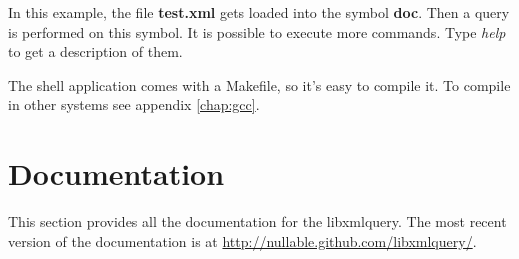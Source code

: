 \documentclass[a4paper]{report}
\begin{document}
		In this example, the file \textbf{test.xml} gets loaded into the symbol \textbf{doc}. Then a query is performed on this symbol. It is possible to execute more commands. Type \emph{help} to get a description of them.
		
		The shell application comes with a Makefile, so it's easy to compile it. To compile in other systems see appendix \ref{chap:gcc}.
		
\chapter{Documentation}\label{chap:doc}
	This section provides all the documentation for the libxmlquery. The most recent version of the documentation is at \url{http://nullable.github.com/libxmlquery/}.
	
\end{document}
